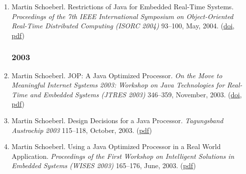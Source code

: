 \begin{enumerate}
\item Martin Schoeberl.
 Restrictions of Java for Embedded Real-Time Systems.
 \emph{Proceedings of the 7th IEEE International Symposium on Object-Oriented Real-Time Distributed Computing (ISORC 2004)} 93--100, May, 2004.
(\href{http://dx.doi.org/10.1109/ISORC.2004.1300334}{doi}, \href{http://www.jopdesign.com/doc/rtjava.pdf}{pdf})


\subsubsection*{2003}

\item Martin Schoeberl.
 JOP: A Java Optimized Processor.
 \emph{On the Move to Meaningful Internet Systems 2003: Workshop on {J}ava Technologies for Real-Time and Embedded Systems (JTRES 2003)} 346--359, November, 2003.
(\href{http://dx.doi.org/10.1007/b94345}{doi}, \href{http://www.jopdesign.com/doc/jtres03.pdf}{pdf})

\item Martin Schoeberl.
 Design Decisions for a Java Processor.
 \emph{Tagungsband Austrochip 2003} 115--118, October, 2003.
(\href{http://www.jopdesign.com/doc/austrochip03.pdf}{pdf})

\item Martin Schoeberl.
 Using a Java Optimized Processor in a Real World Application.
 \emph{Proceedings of the First Workshop on Intelligent Solutions in Embedded Systems (WISES 2003)} 165--176, June, 2003.
(\href{http://www.jopdesign.com/doc/wises03.pdf}{pdf})


\end{enumerate}

